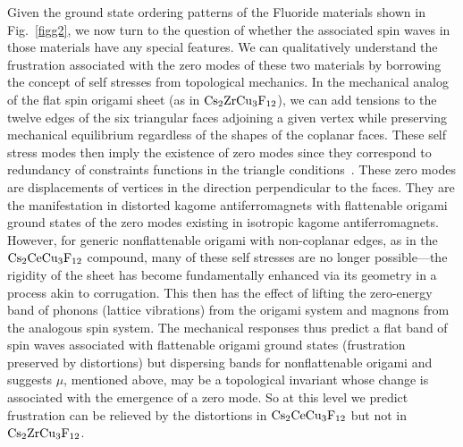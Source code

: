 \documentclass[a4paper,aps,prl,twocolumn,floatfix,showpacs,superscriptaddress]{revtex4-1}
\begin{document}
Given the ground state ordering patterns of the Fluoride materials shown in Fig.~\ref{figg2}, we now turn to the question of whether the associated spin waves in those materials have any special features. We can qualitatively understand the frustration associated with the zero modes of these two materials by borrowing the concept of self stresses from topological mechanics. In the mechanical analog of the flat spin origami sheet (as in ${\rm Cs}_2{\rm ZrCu}_3{\rm F}_{12}$), we can add tensions to the twelve edges of the six triangular faces adjoining a given vertex while preserving mechanical equilibrium regardless of the shapes of the coplanar faces. These self stress modes then imply the existence of zero modes since they correspond to redundancy of constraints functions in the triangle conditions~\cite{calladine1978buckminster}. These zero modes are displacements of vertices in the direction perpendicular to the faces. They are the manifestation in distorted kagome antiferromagnets with flattenable origami ground states of the zero modes existing in isotropic kagome antiferromagnets. However, for generic nonflattenable origami with non-coplanar edges, as in the ${\rm Cs}_2{\rm CeCu}_3{\rm F}_{12}$ compound, many of these self stresses are no longer possible---the rigidity of the sheet has become fundamentally enhanced via its geometry in a process akin to corrugation. This then has the effect of lifting the zero-energy band of phonons (lattice vibrations) from the origami system and magnons from the analogous spin system. 
The mechanical responses thus predict a flat band of spin waves associated with flattenable origami ground states (frustration preserved by distortions) but dispersing bands for nonflattenable origami and suggests $\mu$, mentioned above, may be a topological invariant whose change is associated with the emergence of a zero mode. So at this level we predict frustration can be relieved by the distortions in ${\rm Cs}_2{\rm CeCu}_3{\rm F}_{12}$ but not in ${\rm Cs}_2{\rm ZrCu}_3{\rm F}_{12}$.
\end{document}

